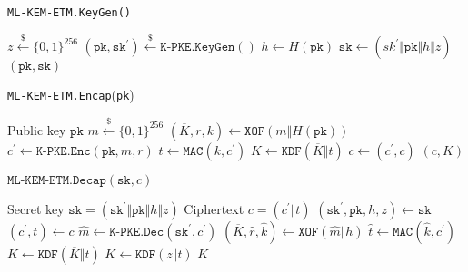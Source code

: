 \documentclass[floatrow,journal=tches,submission]{iacrtrans}
\newcommand{\keygen}{\texttt{KeyGen}}
\newcommand{\encrypt}{\texttt{Enc}}
\newcommand{\decrypt}{\texttt{Dec}}
\newcommand{\mac}{\texttt{MAC}}
\newcommand{\pk}{\texttt{pk}}
\newcommand{\sk}{\texttt{sk}}
\newcommand{\leftsample}{\stackrel{\$}{\leftarrow}}
\begin{document}
\begin{algorithm}[H]
    \caption{\texttt{ML-KEM-ETM.KeyGen()}}\label{alg:ml-kem-etm-keygen}
    \begin{algorithmic}[1]
        \State $z \leftsample \{0,1\}^{256}$
        \State $(\pk, \sk^\prime) \leftsample \texttt{K-PKE}.\keygen()$
        \State $h \leftarrow H(\pk)$
        \State $\sk \leftarrow (sk^\prime \Vert \pk \Vert h \Vert z)$
        \State \Return $(\pk, \sk)$
    \end{algorithmic}
\end{algorithm}

\begin{algorithm}[H]
    \caption{\texttt{ML-KEM-ETM.Encap}(\pk)}\label{alg:ml-kem-etm-encap}
    \begin{algorithmic}[1]
        \Require Public key $\pk$
        \State $m \leftsample \{0,1\}^{256}$
        \State $(\overline{K}, r, k) \leftarrow \texttt{XOF}(m \Vert H(\pk))$
        \State $c^\prime \leftarrow \texttt{K-PKE}.\encrypt(\pk, m, r)$
        \State $t \leftarrow \mac(k, c^\prime)$
        \State $K \leftarrow \texttt{KDF}(\overline{K} \Vert t)$
        \State $c \leftarrow (c^\prime, c)$
        \State \Return $(c, K)$
    \end{algorithmic}
\end{algorithm}

\begin{algorithm}[H]
    \caption{$\texttt{ML-KEM-ETM.Decap}(\sk, c)$}\label{alg:ml-kem-etm-decap}
    \begin{algorithmic}[1]
        \Require Secret key $\sk = (\sk^\prime \Vert \pk \Vert h \Vert z)$
        \Require Ciphertext $c = (c^\prime \Vert t)$
        \State $(\sk^\prime, \pk, h, z) \leftarrow \sk$
        \State $(c^\prime, t) \leftarrow c$
        \State $\hat{m} \leftarrow \texttt{K-PKE}.\decrypt(\sk^\prime, c^\prime)$
        \State $(\overline{K}, \hat{r}, \hat{k}) \leftarrow \texttt{XOF}(\hat{m} \Vert h)$
        \State $\hat{t} \leftarrow \mac(\hat{k}, c^\prime)$
            \State $K \leftarrow \texttt{KDF}(\overline{K} \Vert t)$
        \Else
            \State $K \leftarrow \texttt{KDF}(z \Vert t)$
        \EndIf
        \State \Return $K$
    \end{algorithmic}
\end{algorithm}
\end{document}
